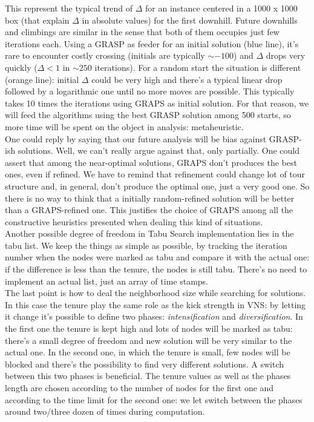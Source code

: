 This represent the typical trend of $\Delta$ for an instance centered in a 1000
x 1000 box (that explain $\Delta$ in absolute values) for the first downhill.
Future downhills and climbings are similar in the sense that both of them
occupies just few iterations each. Using a GRASP as feeder for an initial
solution (blue line), it's rare to encounter costly crossing (initials are
typically $\sim-100$) and $\Delta$ drops very quickly ($\Delta < 1$ in $\sim250$
iterations). For a random start the situation is different (orange line):
initial $\Delta$ could be very high and there's a typical linear drop followed
by a logarithmic one until no more moves are possible. This typically takes 10
times the iterations using GRAPS as initial solution. For that reason, we will
feed the algorithms using the best GRASP solution among 500 starts, so more time
will be spent on the object in analysis: metaheuristic.\\ One could reply by
saying that our future analysis will be bias against GRASP-ish solutions. Well,
we can't really argue against that, only partially. One could assert that among
the near-optimal solutions, GRAPS don't produces the best ones, even if refined.
We have to remind that refinement could change lot of tour structure and, in
general, don't produce the optimal one, just a very good one. So there is no way
to think that a initially random-refined solution will be better than a
GRAPS-refined one. This justifies the choice of GRAPS among all the constructive
heuristics presented when dealing this kind of situations.\\ 
Another possible degree of freedom in Tabu Search implementation lies in the
tabu list. We keep the things as simple as possible, by tracking the iteration
number when the nodes were marked as tabu and compare it with the actual one: if
the difference is less than the tenure, the nodes is still tabu. There's no need
to implement an actual list, just an array of time stamps.\\
The last point is how to deal the neighborhood size while searching for
solutions. In this case the tenure play the same role as the kick strength in
VNS: by letting it change it's possible to define two phases:
\emph{intensification} and \emph{diversification}. In the first one the tenure is
kept high and lots of nodes will be marked as tabu: there's a small degree of
freedom and new solution will be very similar to the actual one. In the second
one, in which the tenure is small, few nodes will be blocked and there's the
possibility to find very different solutions. A switch between this two phases
is beneficial. The tenure values as well as the phases length are chosen
according to the number of nodes for the first one and according to the time
limit for the second one: we let switch between the phases around two/three
dozen of times during computation.

